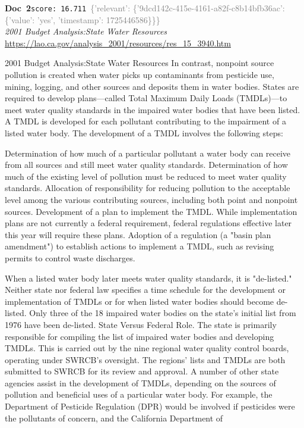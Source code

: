 \documentclass[a4paper,11pt]{article}
\begin{document}
\begin{docenv}
{\footnotesize\textcolor{doccolor}{\textbf{Doc~2}}}\hfill{\tiny\texttt{score:~16.711}}\ {\tiny\textcolor{gray}{\{'relevant': \{'9dcd142c-415e-4161-a82f-c8b14bfb36ac': \{'value': 'yes', 'timestamp': 1725446586\}\}\}}}\\[3pt]
{\small\textit{2001 Budget Analysis:State Water Resources }}\\[2pt]
{\tiny\url{https://lao.ca.gov/analysis\_2001/resources/res\_15\_3940.htm}}\\[4pt]
{\footnotesize 2001 Budget Analysis:State Water Resources 
In contrast, nonpoint source pollution is created when water picks up
contaminants from pesticide use, mining, logging, and other sources and deposits them in water bodies.
States are required to develop plans—called Total Maximum Daily Loads (TMDLs)—to meet water quality standards in the impaired water bodies that have been
listed. A TMDL is developed for each pollutant contributing to the impairment of a listed water body. The development of a TMDL involves the following
steps:

Determination of how much of a particular pollutant a water body can receive from all sources and still meet water quality standards. 
Determination of how much of the existing level of pollution must be reduced to meet water quality standards. 
Allocation of responsibility for reducing pollution to the acceptable level among the various contributing sources, including both point and nonpoint sources.
Development of a plan to implement the TMDL. While implementation plans are not currently a federal requirement, federal regulations effective later this
year will require these plans. 
Adoption of a regulation (a "basin plan amendment") to establish actions to implement a TMDL, such as revising permits to control waste discharges. 

When a listed water body later meets water quality standards, it is "de-listed." Neither state nor federal law specifies a time schedule for the development or
implementation of TMDLs or for when listed water bodies should become de-listed. Only three of the 18 impaired water bodies on the state's initial list from
1976 have been de-listed.
State Versus Federal Role. The state is primarily responsible for compiling the list of impaired water bodies and developing TMDLs. This is carried out by the
nine regional water quality control boards, operating under SWRCB's oversight. The regions' lists and TMDLs are both submitted to SWRCB for its review and
approval.
A number of other state agencies assist in the development of TMDLs, depending on the sources of pollution and beneficial uses of a particular water body. For
example, the Department of Pesticide Regulation (DPR) would be involved if pesticides were the pollutants of concern, and the California Department of}
\end{docenv}
\end{document}
